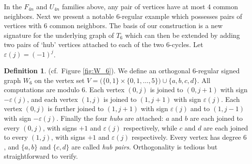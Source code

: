 \documentclass[11pt]{article}
\theoremstyle{plain}
\newcommand{\eps}{\varepsilon}
\theoremstyle{definition}
\newtheorem{definition}[theorem]{Definition}
\begin{document}
In the $F_{4n}$ and $U_{4n}$ families above, any pair of vertices have at most 4 common neighbors. Next we present a notable 6-regular example which possesses pairs of vertices with 6 common neighbors. The basis of our construction is a new signature for the underlying graph of $T_6$ which can then be extended by adding two pairs of `hub' vertices attached to each of the two 6-cycles. Let $\eps(j)=(-1)^j$. 

\begin{definition}\label{defH6} (cf.~Figure \ref{fig:W_6}).
We define an orthogonal $6$-regular signed graph $W_6$ on the vertex set $V=\bigl(\{0,1\}\times\{0,1,\dots,5\}\bigr)\cup\{a,b,c,d\}$.  All computations
are modulo $6$. Each vertex $(0,j)$ is joined to $(0,j+1)$ with sign $-\eps(j)$, and each
vertex $(1,j)$ is joined to $(1,j+1)$ with sign $\eps(j)$.  Each vertex
$(0,j)$ is further joined to $(1,j+1)$ with sign $\eps(j)$ and to $(1,j-1)$
with sign $-\eps(j)$.  Finally the four \emph{hubs} are attached: $a$ and $b$
are each joined to every $(0,j)$, with signs $+1$ and $\eps(j)$ respectively,
while $c$ and $d$ are each joined to every $(1,j)$, with signs $+1$ and
$\eps(j)$ respectively. Every vertex has degree $6$, and $\{a,b\}$ and $\{c,d\}$ are called \textit{hub pairs}. Orthogonality is tedious but straightforward to verify.
\end{definition}
\end{document}
